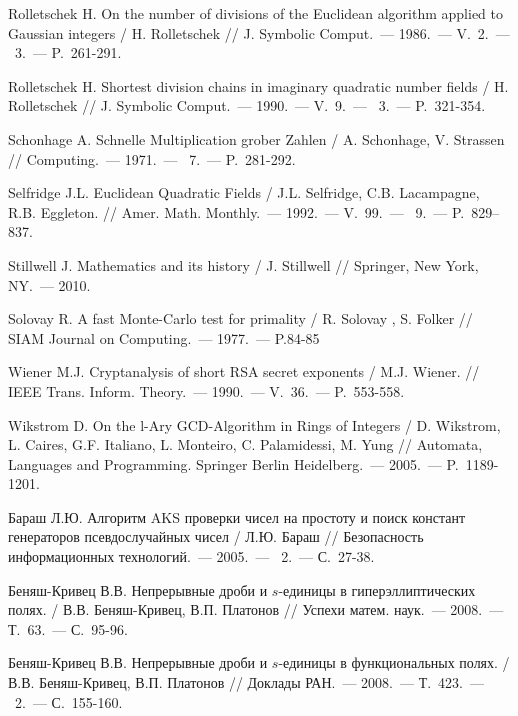 \begin{thebibliography}{99}
    Rolletschek H. On the number of divisions of the Euclidean algorithm applied to Gaussian integers / H. Rolletschek // J. Symbolic Comput.~--- 1986.~--- V.~2.~--- \textnumero~3.~--- P.~261-291.
    
    Rolletschek H. Shortest division chains in imaginary quadratic number fields / H. Rolletschek // J. Symbolic Comput.~--- 1990.~--- V.~9.~--- {\textnumero}~3.~--- P.~321-354.

    Schonhage A. Schnelle Multiplication grober Zahlen / A. Schonhage, V. Strassen // Computing.~--- 1971.~--- {\textnumero}~7.~--- P.~281-292.

    Selfridge J.L. Euclidean Quadratic Fields / J.L. Selfridge, C.B. Lacampagne, R.B. Eggleton. // Amer. Math. Monthly.~--- 1992.~--- V.~99.~--- {\textnumero}~9.~--- P.~829--837.

    Stillwell J. Mathematics and its history / J. Stillwell // Springer, New York, NY.~--- 2010.

    Solovay R. A fast Monte-Carlo test for primality / R. Solovay , S. Folker // SIAM Journal on Computing.~--- 1977.~--- P.84-85
    
    Wiener M.J. Cryptanalysis of short RSA secret exponents / M.J. Wiener. // IEEE Trans. Inform. Theory.~--- 1990.~--- V.~36.~--- P.~553-558.

    Wikstrom D. On the l-Ary GCD-Algorithm in Rings of Integers / D. Wikstrom, L. Caires, G.F. Italiano, L. Monteiro, C. Palamidessi, M. Yung // Automata, Languages and Programming. Springer Berlin Heidelberg.~--- 2005.~--- P.~1189-1201.

    Бараш Л.Ю. Алгоритм AKS проверки чисел на простоту и поиск констант генераторов псевдослучайных чисел / Л.Ю. Бараш // Безопасность информационных технологий.~--- 2005.~--- \textnumero~2.~--- С.~27-38.

    Беняш-Кривец В.В. Непрерывные дроби и $s$-единицы в гиперэллиптических полях. / В.В. Беняш-Кривец, В.П. Платонов // Успехи матем. наук.~--- 2008.~--- Т.~63.~--- С.~95-96.
    
    Беняш-Кривец В.В. Непрерывные дроби и $s$-единицы в функциональных полях. / В.В. Беняш-Кривец, В.П. Платонов // Доклады РАН.~--- 2008.~--- Т.~423.~--- \textnumero~2.~--- С.~155-160.


\end{thebibliography}
